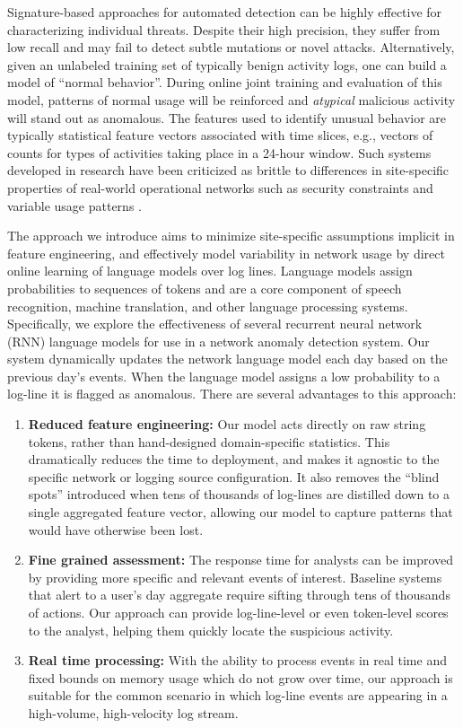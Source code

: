 \documentclass[letterpaper]{article} %
\begin{document}
Signature-based approaches for automated detection can be highly effective for characterizing individual threats.
Despite their high precision, they suffer from low recall and may fail to detect subtle mutations or novel attacks.
Alternatively, given an unlabeled training set of typically benign activity logs, one can build a model of ``normal behavior''.
During online joint training and evaluation of this model, patterns of normal usage will be reinforced and {\em atypical} malicious activity will stand out as anomalous.
The features used to identify unusual behavior are typically statistical feature vectors associated with time slices,
e.g., vectors of counts for types of activities taking place in a 24-hour window. Such systems developed in research have been criticized as brittle to differences in site-specific properties of real-world operational networks such as security constraints and variable usage patterns \cite{Sommer2010outside}.

The approach we introduce aims to minimize site-specific assumptions implicit in feature engineering, and effectively model variability in network usage by direct online learning of language models over log lines.
Language models assign probabilities to sequences of tokens
and are a core component of speech recognition, machine translation, and other language processing systems.
Specifically, we explore the effectiveness of several recurrent neural network (RNN) language models for use in a network anomaly detection system.
Our system dynamically updates the network language model each day based on the previous day's events.
When the language model assigns a low probability to a log-line it is flagged as anomalous.
There are several advantages to this approach:

\begin{enumerate}
    \item {\bf Reduced feature engineering:} Our model acts directly on raw string tokens, rather than hand-designed domain-specific statistics.
        This dramatically reduces the time to deployment, and makes it agnostic to the specific network or logging source configuration.
        It also removes the ``blind spots'' introduced when tens of thousands of log-lines are distilled down to a single aggregated feature vector,
        allowing our model to capture patterns that would have otherwise been lost.
    \item {\bf Fine grained assessment:} The response time for analysts can be improved by providing more specific and relevant events of interest. Baseline systems that alert to a user's day aggregate require sifting through tens of thousands of actions.
        Our approach can provide log-line-level or even token-level scores to the analyst, helping them quickly locate the suspicious activity.
        \item {\bf Real time processing:}
        With the ability to process events in real time and fixed bounds on memory usage which do not grow over time, our approach is suitable for the common scenario in which log-line events are appearing in a high-volume, high-velocity log stream.
\end{enumerate}
\end{document}
